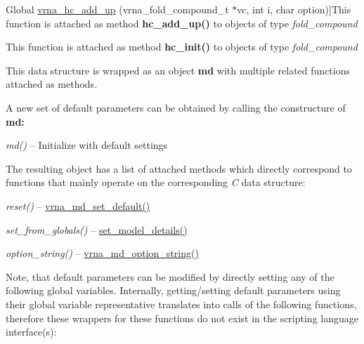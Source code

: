 \begin{DoxyRefList}
Global \mbox{\hyperlink{group__hard__constraints_gaeb352e3e6ccd2b567bafa451365bb545}{vrna\+\_\+hc\+\_\+add\+\_\+up}} (vrna\+\_\+fold\+\_\+compound\+\_\+t $\ast$vc, int i, char option)]This function is attached as method {\bfseries hc\+\_\+add\+\_\+up()} to objects of type {\itshape fold\+\_\+compound}  
\item[\label{wrappers__wrappers000003}%
\Hypertarget{wrappers__wrappers000003}%
Global \mbox{\hyperlink{group__hard__constraints_ga36ff456c43bf920629cee5a236e4f0ff}{vrna\+\_\+hc\+\_\+init}} (vrna\+\_\+fold\+\_\+compound\+\_\+t $\ast$vc)]This function is attached as method {\bfseries hc\+\_\+init()} to objects of type {\itshape fold\+\_\+compound}  
\item[\label{wrappers__wrappers000042}%
\Hypertarget{wrappers__wrappers000042}%
Class \mbox{\hyperlink{structvrna__md__s}{vrna\+\_\+md\+\_\+s}} ]This data structure is wrapped as an object {\bfseries md} with multiple related functions attached as methods.

A new set of default parameters can be obtained by calling the constructure of {\bfseries md\+:} ~\newline

\begin{DoxyItemize}
\item {\itshape md()} -- Initialize with default settings
\end{DoxyItemize}

The resulting object has a list of attached methods which directly correspond to functions that mainly operate on the corresponding {\itshape C} data structure\+:~\newline

\begin{DoxyItemize}
\item {\itshape reset()} -- \mbox{\hyperlink{group__model__details_ga8ac6ff84936282436f822644bf841f66}{vrna\+\_\+md\+\_\+set\+\_\+default()}}
\item {\itshape set\+\_\+from\+\_\+globals()} -- \mbox{\hyperlink{group__model__details_gabad896c3650d420f3f3ddefc69e2bceb}{set\+\_\+model\+\_\+details()}}
\item {\itshape option\+\_\+string()} -- \mbox{\hyperlink{group__model__details_ga3a7469f0725a849af6ba61a57dfd60ce}{vrna\+\_\+md\+\_\+option\+\_\+string()}}
\end{DoxyItemize}

Note, that default parameters can be modified by directly setting any of the following global variables. Internally, getting/setting default parameters using their global variable representative translates into calls of the following functions, therefore these wrappers for these functions do not exist in the scripting language interface(s)\+:


\end{DoxyRefList}
